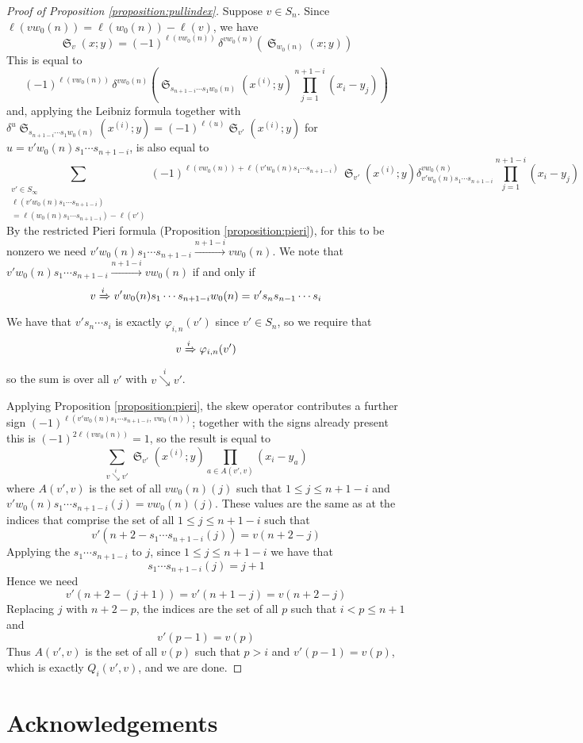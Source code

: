 \documentclass{amsart}
\theoremstyle{definition}
\theoremstyle{remark}
\numberwithin{equation}{subsection}
\DeclareMathOperator{\sch}{\mathfrak{S}}
\newcommand{\downvar}[1]{\stackrel{#1}{\searrow}}
\newcommand{\tom}[1]{\xrightarrow{#1}}
\newcommand{\Tom}[1]{\xRightarrow{#1}}
\newcommand{\ddv}[1]{\delta}
\begin{document}
\begin{proof}[Proof of Proposition \ref{proposition:pullindex}]
Suppose $v\in S_n$. Since $\ell(vw_0(n))=\ell(w_0(n))-\ell(v)$, we have
$$\sch_v(x;y)=(-1)^{\ell(vw_0(n))}\,\ddv{y}^{vw_0(n)}(\sch_{w_0(n)}(x;y))$$
This is equal to
$$(-1)^{\ell(vw_0(n))}\,\ddv{y}^{vw_0(n)}\left(\sch_{s_{n+1-i}\cdots s_1w_0(n)}(x^{(i)};y)\prod_{j=1}^{n+1-i}(x_i - y_j)\right)$$
and, applying the Leibniz formula together with $\delta^u\sch_{s_{n+1-i}\cdots s_1w_0(n)}(x^{(i)};y)=(-1)^{\ell(u)}\sch_{v'}(x^{(i)};y)$ for $u=v'w_0(n)s_1\cdots s_{n+1-i}$, is also equal to
$$\sum_{\substack{v'\in S_\infty\\\ell(v'w_0(n)s_1\cdots s_{n+1-i})\\=\ell(w_0(n)s_1\cdots s_{n+1-i})-\ell(v')}}(-1)^{\ell(vw_0(n))+\ell(v'w_0(n)s_1\cdots s_{n+1-i})}\,\sch_{v'}(x^{(i)};y)\ddv{y}_{v'w_0(n)s_1\cdots s_{n+1-i}}^{vw_0(n)}\prod_{j=1}^{n+1-i}(x_i - y_j)$$
By the restricted Pieri formula (Proposition \ref{proposition:pieri}), for this to be nonzero we need $v'w_0(n)s_1\cdots s_{n+1-i}\allowbreak\tom{n+1-i}vw_0(n)$. We note that $v'w_0(n)s_1\cdots s_{n+1-i}\tom{n+1-i}vw_0(n)$ if and only if 
$$v\Tom{i}v'w_0(n)s_1\cdots s_{n+1-i}w_0(n)=v's_ns_{n-1}\cdots s_i$$
We have that $v's_n\cdots s_i$ is exactly $\varphi_{i,n}(v')$ since $v'\in S_n$, so we require that
$$v\Tom{i}\varphi_{i,n}(v')$$
so the sum is over all $v'$ with $v\downvar{i} v'$.

Applying Proposition \ref{proposition:pieri}, the skew operator contributes a further sign $(-1)^{\ell(v'w_0(n)s_1\cdots s_{n+1-i},\,vw_0(n))}$; together with the signs already present this is $(-1)^{2\ell(vw_0(n))}=1$, so the result is equal to
$$\sum_{v\downvar{i} v'} \sch_{v'}(x^{(i)};y)\prod_{a\in A(v',v)}(x_i - y_a)$$
where $A(v',v)$ is the set of all $vw_0(n)(j)$ such that $1\leq j\leq n+1-i$ and $v'w_0(n)s_1\cdots s_{n+1-i}(j)=vw_0(n)(j)$. These values are the same as at the indices that comprise the set of all $1\leq j\leq n+1-i$ such that
$$v'(n+2-s_1\cdots s_{n+1-i}(j))=v(n+2-j)$$
Applying the $s_1\cdots s_{n+1-i}$ to $j$, since $1\leq j\leq n+1-i$ we have that 
$$s_1\cdots s_{n+1-i}(j)=j+1$$
Hence we need
$$v'(n+2-(j+1))=v'(n+1-j)=v(n+2-j)$$
Replacing $j$ with $n+2-p$, the indices are the set of all $p$ such that $i<p\leq n+1$ and
$$v'(p-1)=v(p)$$
Thus $A(v',v)$ is the set of all $v(p)$ such that $p>i$ and $v'(p-1)=v(p)$, which is exactly $Q_i(v',v)$, and we are done.
\end{proof}

\section*{Acknowledgements}
\end{document}
